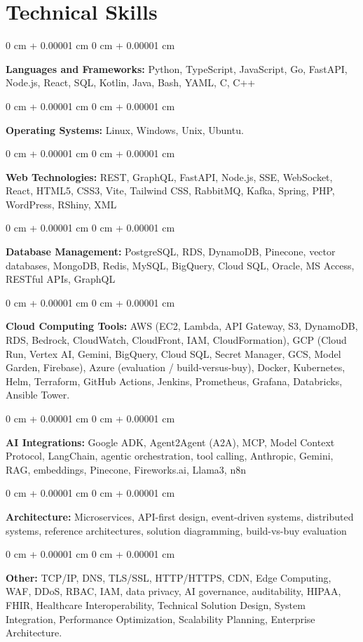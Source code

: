 \documentclass[10pt, letterpaper]{article}
\newenvironment{onecolentry}{
    \begin{adjustwidth}{
        0 cm + 0.00001 cm
    }{
        0 cm + 0.00001 cm
    }
}{
    \end{adjustwidth}
} %
\begin{document}
    \section{Technical Skills}
    \vspace{2 pt }
    \begin{onecolentry}
    \textbf{Languages and Frameworks:} Python, TypeScript, JavaScript, Go, FastAPI, Node.js, React, SQL, Kotlin, Java, Bash, YAML, C, C++
    \end{onecolentry}
    \begin{onecolentry}
        \textbf{Operating Systems:} Linux, Windows, Unix, Ubuntu.
    \end{onecolentry}
    \begin{onecolentry}
         \textbf{Web Technologies:} REST, GraphQL, FastAPI, Node.js, SSE, WebSocket, React, HTML5, CSS3, Vite, Tailwind CSS, RabbitMQ, Kafka, Spring, PHP, WordPress, RShiny, XML
    \end{onecolentry}
    \begin{onecolentry}
        \textbf{Database Management:} PostgreSQL, RDS, DynamoDB, Pinecone, vector databases, MongoDB, Redis, MySQL, BigQuery, Cloud SQL, Oracle, MS Access, RESTful APIs, GraphQL
    \end{onecolentry}
    \begin{onecolentry}
        \textbf{Cloud Computing Tools:}
AWS (EC2, Lambda, API Gateway, S3, DynamoDB, RDS, Bedrock, CloudWatch, CloudFront, IAM, CloudFormation), GCP (Cloud Run, Vertex AI, Gemini, BigQuery, Cloud SQL, Secret Manager, GCS, Model Garden, Firebase), Azure (evaluation / build-versus-buy), Docker, Kubernetes, Helm, Terraform, GitHub Actions, Jenkins, Prometheus, Grafana, Databricks, Ansible Tower.
    \end{onecolentry}
    \begin{onecolentry}
         \textbf{AI Integrations:} Google ADK, Agent2Agent (A2A), MCP, Model Context Protocol, LangChain, agentic orchestration, tool calling, Anthropic, Gemini, RAG, embeddings, Pinecone, Fireworks.ai, Llama3, n8n
    \end{onecolentry}
    \begin{onecolentry}
        \textbf{Architecture:} Microservices, API-first design, event-driven systems, distributed systems, reference architectures, solution diagramming, build-vs-buy evaluation
    \end{onecolentry}
        \begin{onecolentry}
     \textbf{Other:} TCP/IP, DNS, TLS/SSL, HTTP/HTTPS, CDN, Edge Computing, WAF, DDoS, RBAC, IAM, data privacy, AI governance, auditability, HIPAA, FHIR, Healthcare Interoperability, Technical Solution Design, System Integration, Performance Optimization, Scalability Planning, Enterprise Architecture.
    \end{onecolentry}
\end{document}
